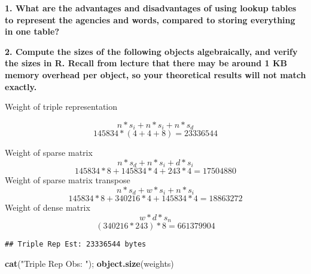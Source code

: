 \documentclass[]{article}
\newenvironment{Shaded}{\begin{snugshade}}{\end{snugshade}}
\newcommand{\CharTok}[1]{\textcolor[rgb]{0.31,0.60,0.02}{#1}}
\newcommand{\CommentTok}[1]{\textcolor[rgb]{0.56,0.35,0.01}{\textit{#1}}}
\newcommand{\DecValTok}[1]{\textcolor[rgb]{0.00,0.00,0.81}{#1}}
\newcommand{\KeywordTok}[1]{\textcolor[rgb]{0.13,0.29,0.53}{\textbf{#1}}}
\newcommand{\NormalTok}[1]{#1}
\newcommand{\OperatorTok}[1]{\textcolor[rgb]{0.81,0.36,0.00}{\textbf{#1}}}
\newcommand{\StringTok}[1]{\textcolor[rgb]{0.31,0.60,0.02}{#1}}
\begin{document}
\textbf{1. What are the advantages and disadvantages of using lookup
tables to represent the agencies and words, compared to storing
everything in one table?}

\textbf{2. Compute the sizes of the following objects algebraically, and
verify the sizes in R. Recall from lecture that there may be around 1 KB
memory overhead per object, so your theoretical results will not match
exactly.}

Weight of triple representation

\[ n * s_i + n * s_i + n * s_d \] \[ 145834 * (4 + 4 + 8) = 23336544\]

Weight of sparse matrix \[ n * s_d + n * s_i + d * s_i \]
\[ 145834 * 8 + 145834 * 4 + 243 * 4 = 17504880\] Weight of sparse
matrix transpose \[ n * s_d + w * s_i + n * s_i\]
\[ 145834 * 8 + 340216 * 4 + 145834 * 4 = 18863272\] Weight of dense
matrix \[ w * d * s_n\] \[ (340216 * 243) * 8 = 661379904\]

\begin{Shaded}
\end{Shaded}

\begin{verbatim}
## Triple Rep Est: 23336544 bytes
\end{verbatim}

\begin{Shaded}
\begin{Highlighting}[]
\KeywordTok{cat}\NormalTok{(}\StringTok{"Triple Rep Obs: "}\NormalTok{); }\KeywordTok{object.size}\NormalTok{(weights)}
\end{Highlighting}
\end{Shaded}
\end{document}

